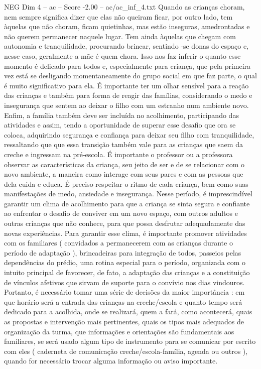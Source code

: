 \begin{textsample}{NEG Dim 4 – ac – Score -2.00 – ac/ac\_inf\_4.txt}
Quando as crianças choram, nem sempre significa dizer que elas não queiram ficar, por outro lado, tem àquelas que não choram, ficam quietinhas, mas estão inseguras, amedrontadas e não querem permanecer naquele lugar.
Tem ainda àquelas que chegam com autonomia e tranquilidade, procurando brincar, sentindo -se donas do espaço e, nesse caso, geralmente a mãe é quem chora.
Isso nos faz inferir o quanto esse momento é delicado para todos e, especialmente para criança, que pela primeira vez está se desligando momentaneamente do grupo social em que faz parte, o qual é muito significativo para ela.
É importante ter um olhar sensível para a reação das crianças e também para forma de reagir das famílias, considerando o medo e insegurança que sentem ao deixar o filho com um estranho num ambiente novo.
Enfim, a família também deve ser incluída no acolhimento, participando das atividades e assim, tendo a oportunidade de superar esse desafio que ora se coloca, adquirindo segurança e confiança para deixar seu filho com tranquilidade, ressaltando que que essa transição também vale para as crianças que saem da creche e ingressam na pré-escola.
É importante o professor ou a professora observar as características da criança, seu jeito de ser e de se relacionar com o novo ambiente, a maneira como interage com seus pares e com as pessoas que dela cuida e educa.
É preciso respeitar o ritmo de cada criança, bem como suas manifestações de medo, ansiedade e insegurança.
Nesse período, é imprescindível garantir um clima de acolhimento para que a criança se sinta segura e confiante ao enfrentar o desafio de conviver em um novo espaço, com outros adultos e outras crianças que não conhece, para que possa desfrutar adequadamente das novas experiências.
Para garantir esse clima, é importante promover atividades com os familiares ( convidados a permanecerem com as crianças durante o período de adaptação ), brincadeiras para integração de todos, passeios pelas dependências do prédio, uma rotina especial para o período, organizada com o intuito principal de favorecer, de fato, a adaptação das crianças e a constituição de vínculos afetivos que sirvam de suporte para o convívio nos dias vindouros.
Portanto, é necessário tomar uma série de decisões da maior importância : em que horário será a entrada das crianças na creche/escola e quanto tempo será dedicado para a acolhida, onde se realizará, quem a fará, como acontecerá, quais as propostas e intervenção mais pertinentes, quais os tipos mais adequados de organização da turma, que informações e orientações são fundamentais aos familiares, se será usado algum tipo de instrumento para se comunicar por escrito com eles ( caderneta de comunicação creche/escola-família, agenda ou outros ), quando for necessário trocar alguma informação ou aviso importante.

\end{textsample}
